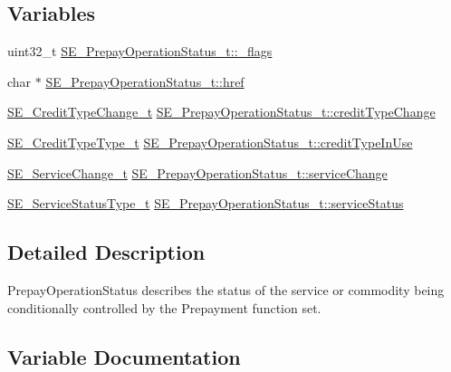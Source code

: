 \subsection*{Variables}
\begin{DoxyCompactItemize}
\item 
uint32\+\_\+t \hyperlink{group__PrepayOperationStatus_ga5f61a74f1a28ce905aa0c45ecf150704}{S\+E\+\_\+\+Prepay\+Operation\+Status\+\_\+t\+::\+\_\+flags}
\item 
char $\ast$ \hyperlink{group__PrepayOperationStatus_ga4111baa24c3cf308caa4879263d9354e}{S\+E\+\_\+\+Prepay\+Operation\+Status\+\_\+t\+::href}
\item 
\hyperlink{structSE__CreditTypeChange__t}{S\+E\+\_\+\+Credit\+Type\+Change\+\_\+t} \hyperlink{group__PrepayOperationStatus_ga585930db1ced44829ce2699542c605da}{S\+E\+\_\+\+Prepay\+Operation\+Status\+\_\+t\+::credit\+Type\+Change}
\item 
\hyperlink{group__CreditTypeType_ga5a63742e5c65087df17ed6ad8f420b5e}{S\+E\+\_\+\+Credit\+Type\+Type\+\_\+t} \hyperlink{group__PrepayOperationStatus_ga931c94832d59d1ab3b0940fcf20bb956}{S\+E\+\_\+\+Prepay\+Operation\+Status\+\_\+t\+::credit\+Type\+In\+Use}
\item 
\hyperlink{structSE__ServiceChange__t}{S\+E\+\_\+\+Service\+Change\+\_\+t} \hyperlink{group__PrepayOperationStatus_ga3934e843a26a66a371d3fc0e867d8238}{S\+E\+\_\+\+Prepay\+Operation\+Status\+\_\+t\+::service\+Change}
\item 
\hyperlink{group__ServiceStatusType_gaa3cd725afc87388d65acf81254caee7d}{S\+E\+\_\+\+Service\+Status\+Type\+\_\+t} \hyperlink{group__PrepayOperationStatus_ga14485626368fa2177e115ed7117f2338}{S\+E\+\_\+\+Prepay\+Operation\+Status\+\_\+t\+::service\+Status}
\end{DoxyCompactItemize}


\subsection{Detailed Description}
Prepay\+Operation\+Status describes the status of the service or commodity being conditionally controlled by the Prepayment function set. 

\subsection{Variable Documentation}
\mbox{\label{group__PrepayOperationStatus_ga5f61a74f1a28ce905aa0c45ecf150704}} 
